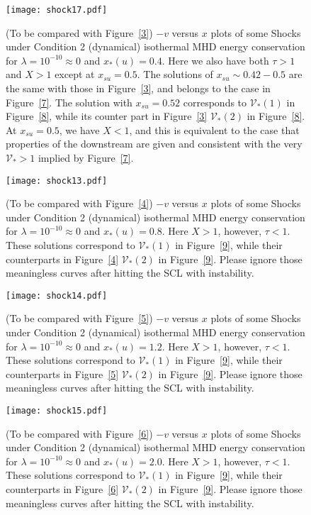 \documentclass[fleqn,usenatbib]{mnras}
\begin{document}
\begin{figure}
\centering
\texttt{[image: shock17.pdf]}
\caption{(To be compared with Figure~\ref{3}) $-v$ versus $x$ plots of some Shocks under Condition 2 (dynamical) isothermal MHD energy conservation for $\lambda=10^{-10}\approx 0$ and $x_{*}(u)=0.4$. Here we also have both $\tau>1$ and $X>1$ except at $x_{su}=0.5$. The solutions of $x_{su}\sim 0.42-0.5$ are the same with those in Figure~\ref{3}, and belongs to the case in Figure~\ref{7}. The solution with $x_{su}=0.52$ corresponds to $\mathcal{V}_{*}(1)$ in Figure~\ref{8}, while its counter part in Figure~\ref{3} $\mathcal{V}_{*}(2)$ in Figure~\ref{8}. At $x_{su}=0.5$, we have $X<1$, and this is equivalent to the case that properties of the downstream are given and consistent with the very $\mathcal{V}_{*}>1$ implied by Figure~\ref{7}.}
\label{11}
\end{figure}

\begin{figure}
\centering
\texttt{[image: shock13.pdf]}
\caption{(To be compared with Figure~\ref{4}) $-v$ versus $x$ plots of some Shocks under Condition 2 (dynamical) isothermal MHD energy conservation for $\lambda=10^{-10}\approx 0$ and $x_{*}(u)=0.8$. Here $X>1$, however, $\tau<1$. These solutions correspond to $\mathcal{V}_{*}(1)$ in Figure~\ref{9}, while their counterparts in Figure~\ref{4} $\mathcal{V}_{*}(2)$ in Figure~\ref{9}. Please ignore those meaningless curves after hitting the SCL with instability.}
\label{12}
\end{figure}

\begin{figure}
\centering
\texttt{[image: shock14.pdf]}
\caption{(To be compared with Figure~\ref{5}) $-v$ versus $x$ plots of some Shocks under Condition 2 (dynamical) isothermal MHD energy conservation for $\lambda=10^{-10}\approx 0$ and $x_{*}(u)=1.2$. Here $X>1$, however, $\tau<1$. These solutions correspond to $\mathcal{V}_{*}(1)$ in Figure~\ref{9}, while their counterparts in Figure~\ref{5} $\mathcal{V}_{*}(2)$ in Figure~\ref{9}. Please ignore those meaningless curves after hitting the SCL with instability.}
\label{13}
\end{figure}

\begin{figure}
\centering
\texttt{[image: shock15.pdf]}
\caption{(To be compared with Figure~\ref{6}) $-v$ versus $x$ plots of some Shocks under Condition 2 (dynamical) isothermal MHD energy conservation for $\lambda=10^{-10}\approx 0$ and $x_{*}(u)=2.0$. Here $X>1$, however, $\tau<1$. These solutions correspond to $\mathcal{V}_{*}(1)$ in Figure~\ref{9}, while their counterparts in Figure~\ref{6} $\mathcal{V}_{*}(2)$ in Figure~\ref{9}. Please ignore those meaningless curves after hitting the SCL with instability.}
\label{14}
\end{figure}


 

\label{lastpage}
\end{document}
